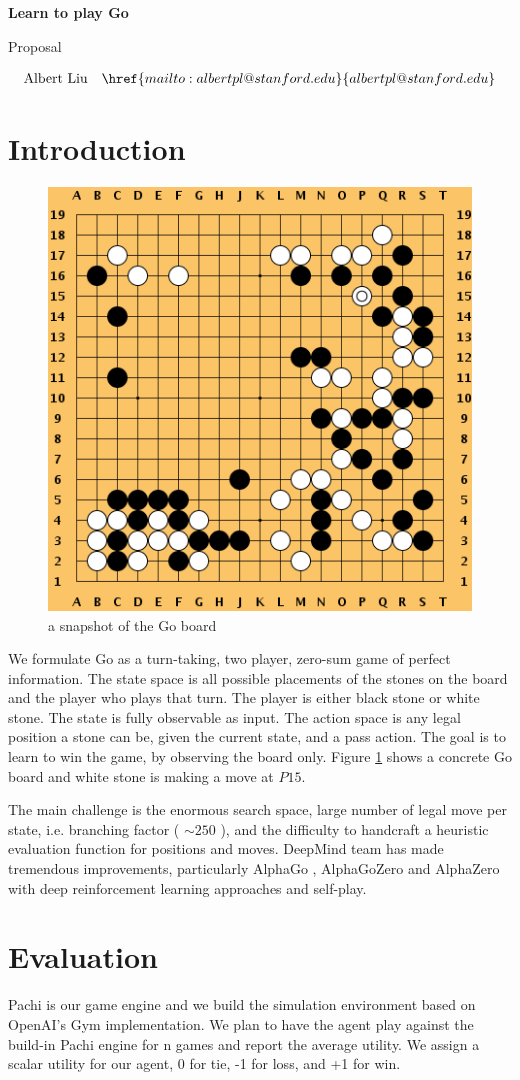 \documentclass{article}
\begin{document}
\hrulefill \par
{\Large \textbf{Learn to play Go}\par}
{\Large Proposal\par}
\hrulefill \par
\begin{align*}
\mathrm{Albert\ Liu} &&\href{mailto:albertpl@stanford.edu}{albertpl@stanford.edu}\\
\end{align*}

\section{Introduction}
\begin{figure}[H]
\begin{center}
\includegraphics[width=0.25\linewidth]{goboard}
\end{center}
\caption{a snapshot of the Go board}
\label{fig:goboard}
\end{figure}

We formulate Go as a turn-taking, two player, zero-sum game of perfect information. The state space is all possible placements of the stones on the board and the player who plays that turn. The player is either black stone or white stone. The state is fully observable as input. The action space is any legal position a stone can be, given the current state, and a pass action. The goal is to learn to win the game, by observing the board only. Figure \ref{fig:goboard} shows a concrete Go board and white stone is making a move at $P15$. 

The main challenge is the enormous search space, large number of legal move per state, i.e. branching factor ( $\sim 250$ ),  and the difficulty to handcraft a heuristic evaluation function for positions and moves. DeepMind team has made tremendous improvements, particularly AlphaGo \cite{silver2016mastering}, AlphaGoZero \cite{silver2017masteringalphagozero} and AlphaZero \cite{silver2017masteringalphazero} with deep reinforcement learning approaches and self-play.

\section{Evaluation}
Pachi \cite{baudivs2011pachi} is our game engine and we build the simulation environment based on OpenAI's Gym \cite{brockman2016openai} implementation. We plan to have the agent play against the build-in Pachi engine for n games and report the average utility. We assign a scalar utility for our agent, 0 for tie, -1 for loss, and +1 for win. 
\end{document}

